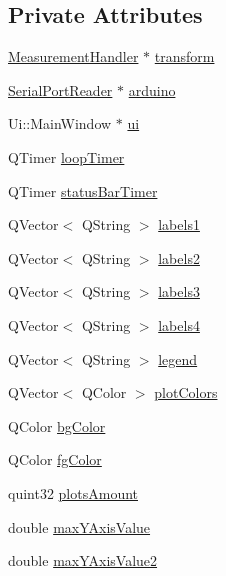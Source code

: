 \subsection*{Private Attributes}
\begin{DoxyCompactItemize}
\item 
\mbox{\hyperlink{class_measurement_handler}{Measurement\+Handler}} $\ast$ \mbox{\hyperlink{class_main_window_a6a921ce08975d864ff158f36760802a8}{transform}}
\item 
\mbox{\hyperlink{class_serial_port_reader}{Serial\+Port\+Reader}} $\ast$ \mbox{\hyperlink{class_main_window_aba5a40e0587b38a584b92583600373f6}{arduino}}
\item 
Ui\+::\+Main\+Window $\ast$ \mbox{\hyperlink{class_main_window_a35466a70ed47252a0191168126a352a5}{ui}}
\item 
Q\+Timer \mbox{\hyperlink{class_main_window_a623ca812f462c5bc27daf8a94cff59d1}{loop\+Timer}}
\item 
Q\+Timer \mbox{\hyperlink{class_main_window_af66c315b651ade2e54045edb68c51c86}{status\+Bar\+Timer}}
\item 
Q\+Vector$<$ Q\+String $>$ \mbox{\hyperlink{class_main_window_a9243762b319de95b998df3e36934d6ef}{labels1}}
\item 
Q\+Vector$<$ Q\+String $>$ \mbox{\hyperlink{class_main_window_a81d3e91905b239abfc54858b2954b7f7}{labels2}}
\item 
Q\+Vector$<$ Q\+String $>$ \mbox{\hyperlink{class_main_window_ab9b1318826e6722ec4a5dd99cd0ae353}{labels3}}
\item 
Q\+Vector$<$ Q\+String $>$ \mbox{\hyperlink{class_main_window_a513d5d910d4ece239f1a25d6240869ce}{labels4}}
\item 
Q\+Vector$<$ Q\+String $>$ \mbox{\hyperlink{class_main_window_a80e2a1a6949dc004e0729bdb133497dd}{legend}}
\item 
Q\+Vector$<$ Q\+Color $>$ \mbox{\hyperlink{class_main_window_af05a0194c683ce9a5abb789e636494da}{plot\+Colors}}
\item 
Q\+Color \mbox{\hyperlink{class_main_window_a4a1005daadc7447af6907c57b54e41ab}{bg\+Color}}
\item 
Q\+Color \mbox{\hyperlink{class_main_window_a1f5455abfb51d7c4733bfad76ac60606}{fg\+Color}}
\item 
quint32 \mbox{\hyperlink{class_main_window_a390ce6d302bff7952eee7d92a6cf3da3}{plots\+Amount}}
\item 
double \mbox{\hyperlink{class_main_window_a79199e3cec2bb50434f184cc762bce2e}{max\+Y\+Axis\+Value}}
\item 
double \mbox{\hyperlink{class_main_window_a5cbbcacb99514a12d6743ebb45836f12}{max\+Y\+Axis\+Value2}}
\end{DoxyCompactItemize}


